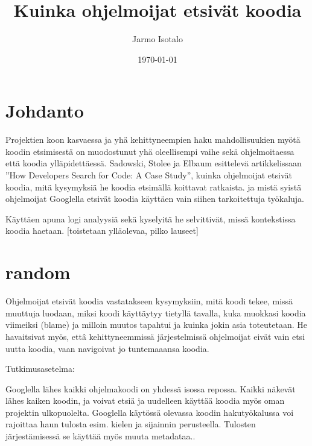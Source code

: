 \documentclass[finnish]{../tktltiki2}
\title{Kuinka ohjelmoijat etsivät koodia}
\author{Jarmo Isotalo}
\date{\today}
\theoremstyle{definition}
\theoremstyle{remark}
\begin{document}

\frontmatter      %

\maketitle        %

\tableofcontents  %


\mainmatter       %

\section{Johdanto}

Projektien koon kasvaessa ja yhä kehittyneempien haku mahdollisuukien myötä koodin etsimisestä on muodostunut yhä oleellisempi vaihe sekä ohjelmoitaessa että koodia ylläpidettäessä. Sadowski, Stolee ja Elbaum esittelevä artikkelissaan ''How Developers Search for Code: A Case Study'', kuinka ohjelmoijat etsivät koodia, mitä kysymyksiä he koodia etsimällä koittavat ratkaista. ja mistä syistä ohjelmoijat Googlella etsivät koodia käyttäen vain siihen tarkoitettuja työkaluja.

Käyttäen apuna logi analyysiä sekä kyselyitä he selvittivät, missä kontekstissa koodia haetaan. [toistetaan ylläolevaa, pilko lauseet]

\section{random}

Ohjelmoijat etsivät koodia vastatakseen kysymyksiin, mitä koodi tekee, missä muuttuja luodaan, miksi koodi käyttäytyy tietyllä tavalla, kuka muokkasi koodia viimeiksi (blame) ja milloin muutos tapahtui ja kuinka jokin asia toteutetaan.
He havaitsivat myös, ettâ kehittyneemmissä järjestelmissä ohjelmoijat eivät vain etsi uutta koodia, vaan navigoivat jo tuntemaaansa koodia.

Tutkimusasetelma:

Googlella lähes kaikki ohjelmakoodi on yhdessä isossa repossa. Kaikki näkevät lähes kaiken koodin, ja voivat etsiä ja uudelleen käyttää koodia myös oman projektin ulkopuolelta. Googlella käytössä olevassa koodin hakutyökalussa voi rajoittaa haun tulosta esim. kielen ja sijainnin perusteella. Tulosten järjestämisessä se käyttää myös muuta metadataa..
\end{document}
